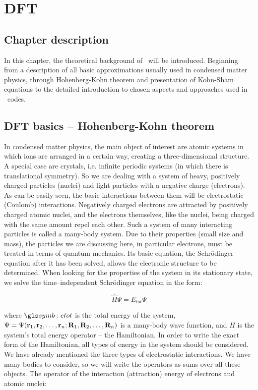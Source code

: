\chapter{DFT}
\label{chap:theory}

\section*{Chapter description}

In this chapter, the theoretical background of \DFT\ will be introduced.
Beginning from a description of all basic approximations usually used in condensed matter physics, through Hohenberg-Kohn theorem and presentation of Kohn-Sham equations to the detailed introduction to chosen aspects and approaches used in \DFT\ codes.
\ornament
\section{DFT basics -- Hohenberg-Kohn theorem}
In condensed matter physics, the main object of interest are atomic systems in which ions are arranged in a certain way, creating a three-dimensional structure.
A special case are crystals, i.e. infinite periodic systems (in which there is translational symmetry).
So we are dealing with a system of heavy, positively charged particles (nuclei) and light particles with a negative charge (electrons).
As can be easily seen, the basic interactions between them will be electrostatic (Coulomb) interactions.
Negatively charged electrons are attracted by positively charged atomic nuclei, and the electrons themselves, like the nuclei, being charged with the same amount repel each other.
Such a system of many interacting particles is called a many-body system.
Due to their properties (small size and mass), the particles we are discussing here, in particular electrons, must be treated in terms of quantum mechanics.
Its basic equation, the Schr\"odinger equation after it has been solved, allows the electronic structure to be determined.
When looking for the properties of the system in its stationary state, we solve the time--independent Schr\"odinger equation in the form: 

\begin{equation}
    \label{Eq:Schrodinger1}
    \hat{H}\Psi=E_{tot}\Psi
\end{equation}

where $\Etot$ is the total energy of the system, $\Psi = \Psi(\mathbf{r}_1, \mathbf{r}_2, \dots,\mathbf{r}_n;\mathbf{R}_1, \mathbf{R}_2, \dots,\mathbf{R}_n) $ is a many-body wave function, and $\hat{H}$ is the system's total energy operator -- the Hamiltonian.
In order to write the exact form of the Hamiltonian, all types of energy in the system should be considered.
We have already mentioned the three types of electrostatic interactions.
We have many bodies to consider, so we will write the operators as sums over all these objects.
The operator of the interaction (attraction) energy of electrons and atomic nuclei: 

